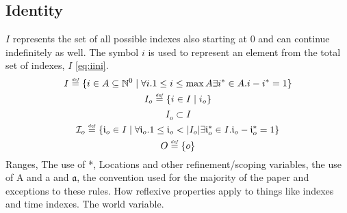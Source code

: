 \documentclass[]{article}
\newcommand{\defeq}{\stackrel{\smash{\scriptscriptstyle\mathit{def}}}{=}}
\begin{document}
\subsection*{Identity}
$I$ represents the set of all possible indexes also starting at $0$ and can continue indefinitely as well. The symbol $i$ is used to represent an element from the total set of indexes, $I$ \eqref{eq:iini}. 
%
\begin{equation} \label {eq:global_identity}
I \defeq \{ i \in A \subseteq \mathbb{N}^{0} \mid \forall i.1 \leq i \leq \max A\exists i^{*} \in A.i-i^{*}=1 \}
\end{equation}
\begin{equation} \label {eq:object_identity}
I_{o} \defeq \{ i \in I \mid i_{o} \}
\end{equation}
\begin{equation} \label {eq:subset_global_identity}
I_{o} \subset I
\end{equation}
\begin{equation} \label{eq:relative_object_identity}
\mathcal{I}_{o} \defeq \{ \mathfrak{i}_{o} \in I \mid \forall \mathfrak{i}_{o}.1 \leq \mathfrak{i}_{o} < |I_{o}| \exists \mathfrak{i}^{*}_{o} \in I.\mathfrak{i}_{o}-\mathfrak{i}^{*}_{o}=1 \} 
\end{equation}
\begin{equation} \label{eq:object}
O \defeq \{ o \}
\end{equation}
%
Ranges, The use of *, Locations and other refinement/scoping variables, the use of A and a and $\mathfrak{a}$, the convention used for the majority of the paper and exceptions to these rules. How reflexive properties apply to things like indexes and time indexes. The world variable. 
\end{document}
